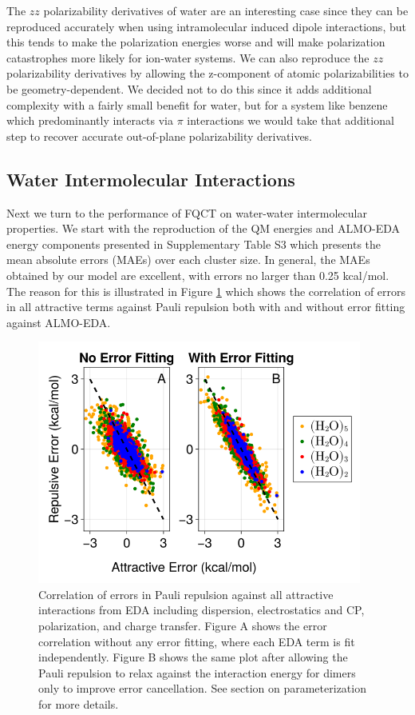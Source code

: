 \documentclass[journal=jctcce,manuscript=article]{achemso}
\begin{document}
The $zz$ polarizability derivatives of water are an interesting case since they can be reproduced accurately when using intramolecular induced dipole interactions, but this tends to make the polarization energies worse and will make polarization catastrophes more likely for ion-water systems. We can also reproduce the $zz$ polarizability derivatives by allowing the z-component of atomic polarizabilities to be geometry-dependent. We decided not to do this since it adds additional complexity with a fairly small benefit for water, but for a system like benzene which predominantly interacts via $\pi$ interactions we would take that additional step to recover accurate out-of-plane polarizability derivatives.

\subsection*{Water Intermolecular Interactions}
Next we turn to the performance of FQCT on water-water intermolecular properties. We start with the reproduction of the QM energies and ALMO-EDA energy components presented in Supplementary Table S3 which presents the mean absolute errors (MAEs) over each cluster size. In general, the MAEs obtained by our model are excellent, with errors no larger than 0.25 kcal/mol. The reason for this is illustrated in Figure \ref{fig:error_correlation} which shows the correlation of errors in all attractive terms against Pauli repulsion both with and without error fitting against ALMO-EDA.
\begin{figure}[h]
  \includegraphics*[width=0.95\textwidth]{figures/error_correlation.png}
  \caption{Correlation of errors in Pauli repulsion against all attractive interactions from EDA including dispersion, electrostatics and CP, polarization, and charge transfer. Figure A shows the error correlation without any error fitting, where each EDA term is fit independently. Figure B shows
  the same plot after allowing the Pauli repulsion to relax against the interaction
  energy for dimers only to improve error cancellation. See section on parameterization for more details.}
  \label{fig:error_correlation}
\end{figure}
\end{document}
